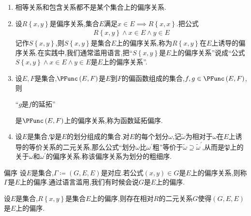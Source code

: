 \begin{example}{}{}
	\begin{enumerate}
		\item 相等关系和包含关系都不是某个集合上的偏序关系.
		\item 设$R\left\{x,y\right\}$是偏序关系,集合$E$满足$x\in E\implies R\left\{x,x\right\}$.把公式
		\begin{align*}
			R\left\{x,y\right\}\wedge x\in E\wedge y\in E
		\end{align*}
		记作$S\left\{x,y\right\}$,则$S\left\{x,y\right\}$是集合$E$上的偏序关系,称为$R\left\{x,y\right\}$在$E$上诱导的偏序关系.在实践中,我们通常滥用语言,把``$S\left\{x,y\right\}$是$E$上的偏序关系''说成``公式$S\left\{x,y\right\}\wedge x\in E\wedge y\in E$是$E$上的偏序关系''.
		\item 设$E,F$是集合,$\PFunc\left(E,F\right)$是$E$到$F$的偏函数组成的集合,$f,g\in\PFunc\left(E,F\right)$,则
		\begin{center}
			``$g$是$f$的延拓''
		\end{center}
		是$\PFunc\left(E,F\right)$上的偏序关系,称为函数延拓偏序.
		\item 设$E$是集合,$\mathfrak{P}$是$E$的划分组成的集合.对$E$的每个划分$\omega$,记$\tilde{\omega}$为相对于$\omega$在$E$上诱导的等价关系的二元关系,那么公式``划分$\omega$比$\omega^{\prime}$粗''等价于$\tilde{\omega}\supseteq\tilde{\omega}^{\prime}$,从而是$\mathfrak{P}$上的关于$\omega$和$\omega^{\prime}$的偏序关系.称该偏序关系为划分的粗细序.
	\end{enumerate}
\end{example}

\begin{definition}{偏序}{}
	设$E$是集合,$\Gamma\coloneq\left(G,E,E\right)$是对应.若公式$\left(x,y\right)\in G$是$E$上的偏序关系,则称$\Gamma$是$E$上的偏序.通过语言滥用,我们有时候会说$G$是$E$上的偏序.
\end{definition}

\begin{proposition}{}{}
	设$E$是集合,$R\left\{x,y\right\}$是集合$E$上的偏序,则存在相对$R$的二元关系$G$使得$\left(G,E,E\right)$是$E$上的偏序.
\end{proposition}

